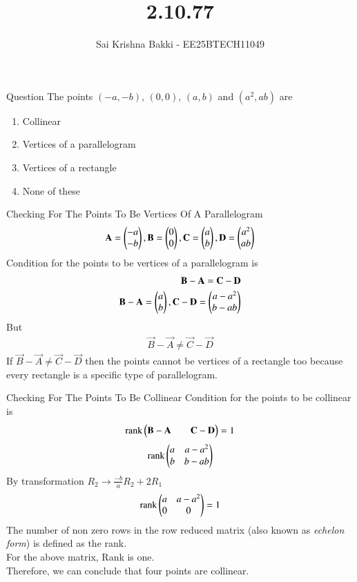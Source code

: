 \documentclass{beamer}
\title %
{2.10.77}
\date{}
\author %
{Sai Krishna Bakki - EE25BTECH11049}
\begin{document}
\frame{\titlepage}
\begin{frame}{Question}
The points $(-a, -b)$, $(0, 0)$, $(a, b)$ and $(a^2, ab)$ are
\begin{enumerate}
\item Collinear
\item Vertices of a parallelogram
\item Vertices of a rectangle
\item None of these
\end{enumerate}
\end{frame}

\begin{frame}{Checking For The Points To Be Vertices Of A Parallelogram}
    \begin{align}
\mathbf{A}=\begin{pmatrix}-a\\-b\end{pmatrix},\mathbf{B}=\begin{pmatrix}0\\0\end{pmatrix},\mathbf{C}=\begin{pmatrix}a\\b\end{pmatrix},\mathbf{D}=\begin{pmatrix}a^2\\ab\end{pmatrix}
\end{align}
Condition for the points to be vertices of a parallelogram is \\
\begin{align}
    \mathbf{B}-\mathbf{A}=\mathbf{C}-\mathbf{D}\\
    \mathbf{B}-\mathbf{A}=\begin{pmatrix}a\\b\end{pmatrix},\mathbf{C}-\mathbf{D}=\begin{pmatrix}a-a^2\\b-ab\end{pmatrix}
\end{align}
But
\begin{align}
\vec{B}-\vec{A} \neq \vec{C}-\vec{D}
\end{align} 
If
$\vec{B}-\vec{A} \neq \vec{C}-\vec{D}$ then the points cannot be vertices of a rectangle too because every rectangle is a specific type of parallelogram.
\end{frame}
\begin{frame}{Checking For The Points To Be Collinear}
    Condition for the points to be collinear is
\begin{align}
    \text{rank}\begin{pmatrix}\mathbf{B} - \mathbf{A} & &\mathbf{C} - \mathbf{D}\end{pmatrix} = 1\\
\end{align}
\begin{align}
    \text{rank}\begin{pmatrix}a & a-a^2\\b & b-ab\end{pmatrix}
\end{align}
By transformation $R_2 \rightarrow \frac{-b}{a}R_2 + 2R_1$
\begin{align}
    \text{rank}\begin{pmatrix}a & a-a^2 \\ 0 & 0\end{pmatrix} =1
\end{align}
The number of non zero rows in the row reduced matrix (also known as {\em echelon form}) is defined as the rank.\\
For the above matrix, Rank is one.\\
Therefore, we can conclude that four points are collinear.

\end{frame}
\end{document}
